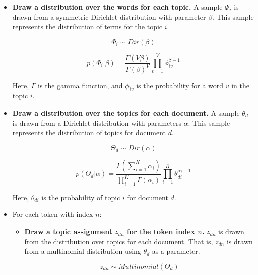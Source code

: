 \begin{itemize}
    \item \textbf{Draw a distribution over the words for each topic.}
        A sample $\Phi_i$ is drawn from a symmetric Dirichlet distribution with parameter $\beta$. 
        This sample represents the distribution of terms for the topic $i$.

        \begin{equation}
            \Phi_i \sim Dir(\beta)
        \end{equation}

        \begin{equation}
            p(\Phi_i | \beta) = \frac{\Gamma(V\beta)}{{\Gamma(\beta)}^V} \prod^V_{v=1}\phi^{\beta-1}_{iv}
        \end{equation}

        Here, $\Gamma$ is the gamma function, and $\phi_{iv}$ is the probability for a word $v$ in the topic $i$.

    \item \textbf{Draw a distribution over the topics for each document.}
        A sample $\theta_d$ is drawn from a Dirichlet distribution with parameters $\alpha$.
        This sample represents the distribution of topics for document $d$.

        \begin{equation}
            \Theta_d \sim Dir(\alpha)
        \end{equation}

        \begin{equation}
            p(\Theta_d | \alpha) = \frac{\Gamma(\sum^K_{i=1}\alpha_i)}{\prod_{i=1}^K\Gamma(\alpha_i)}\prod_{i=1}^K\theta_{di}^{\alpha_i-1}
        \end{equation}

        Here, $\theta_{di}$ is the probability of topic $i$ for document $d$.

    \item For each token with index $n$:

        \begin{itemize}
            \item \textbf{Draw a topic assignment $z_{dn}$ for the token index $n$.} 
                $z_{dn}$ is drawn from the distribution over topics for each document. 
                That is, $z_{dn}$ is drawn from a multinomial distribution using $\theta_d$ as a parameter.

                \begin{equation}
                    z_{dn} \sim Multinomial(\Theta_d)
                \end{equation}


\end{itemize}
\end{itemize}
